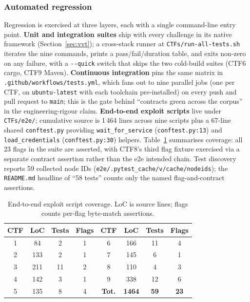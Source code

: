 \subsubsection{Automated regression}
\label{sec:eval-automated}

Regression is exercised at three layers, each with a single
command-line entry point.
\textbf{Unit and integration suites} ship with every
challenge in its native framework (Section~\ref{sec:vvt});
a cross-stack runner at \texttt{CTFs/run-all-tests.sh}
iterates the nine commands, prints a pass/fail/duration
table, and exits non-zero on any failure, with a
\texttt{-{-}quick} switch that skips the two cold-build
suites (CTF6 cargo, CTF9 Maven). \textbf{Continuous
integration} pins the same matrix in
\texttt{.github/workflows/tests.yml}, which fans out to
nine parallel jobs (one per CTF, on
\texttt{ubuntu-latest} with each toolchain pre-installed)
on every push and pull request to \texttt{main}; this is
the gate behind ``contracts green across the corpus'' in
the engineering-rigour claim.
\textbf{End-to-end exploit scripts} live under
\texttt{CTFs/e2e/}; cumulative source is 1\,464 lines
across nine scripts plus a 67-line shared
\texttt{conftest.py} providing \texttt{wait\_for\_service}
(\texttt{conftest.py:13}) and \texttt{load\_credentials}
(\texttt{conftest.py:30}) helpers.
Table~\ref{tab:e2e-coverage} summarises coverage: all 23
flags in the suite are asserted, with CTF8's third flag
fixture exercised via a separate contract assertion rather
than the e2e intended chain. Test discovery reports 59
collected node IDs
(\texttt{e2e/.pytest\_cache/v/cache/nodeids}); the
\texttt{README.md} headline of ``58 tests'' counts only the
named flag-and-contract assertions.

\begin{table}[t]
\centering
\caption{End-to-end exploit script coverage. LoC is source lines;
flags counts per-flag byte-match assertions.}
\label{tab:e2e-coverage}
\small
\begin{tabular}{|c|c|c|c||c|c|c|c|}
\hline
\textbf{CTF} & \textbf{LoC} & \textbf{Tests} & \textbf{Flags}
& \textbf{CTF} & \textbf{LoC} & \textbf{Tests} & \textbf{Flags}\\ \hline
1 & 84  & 2 & 1 & 6 & 166 & 11 & 4 \\ \hline
2 & 133 & 2 & 1 & 7 & 145 & 6  & 1 \\ \hline
3 & 211 & 11 & 2 & 8 & 110 & 4  & 3 \\ \hline
4 & 142 & 3 & 1 & 9 & 338 & 12 & 6 \\ \hline
5 & 135 & 8 & 4 & \textbf{Tot.} & \textbf{1464} & \textbf{59} & \textbf{23} \\ \hline
\end{tabular}
\end{table}

